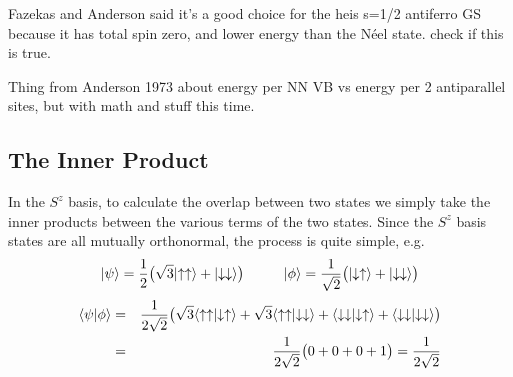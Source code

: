 



{\color{red} Fazekas and Anderson said it's a good choice for the heis s=1/2 antiferro GS
because it has total spin zero, and lower energy than the N\'eel state.  check if this is true.}

{\color{red} Thing from Anderson 1973 about energy per NN VB vs energy per 2 antiparallel sites,
but with math and stuff this time.}

\subsection{The Inner Product}

In the $S^z$ basis, to calculate the overlap between two states we simply take the inner products 
between the various terms of the two states.  
Since the $S^z$ basis states are all mutually orthonormal, the process is quite simple, e.g.
\begin{equation*}
\lvert {\psi} \rangle = \frac{1}{2}\big(\sqrt{3}\lvert {\uparrow\uparrow} \rangle + \lvert {\downarrow\downarrow} \rangle\big) \hspace{1cm}
\lvert {\phi} \rangle = \frac{1}{\sqrt{2}} \big(\lvert {\downarrow\uparrow} \rangle + \lvert {\downarrow\downarrow} \rangle\big) \nonumber
\end{equation*}
\begin{eqnarray}
\langle{\psi}\vert{\phi}\rangle&=& \frac{1}{2\sqrt{2}}\big(
		\sqrt{3}\langle{\uparrow\uparrow}\vert{\downarrow\uparrow}\rangle + \sqrt{3}\langle{\uparrow\uparrow}\vert{\downarrow\downarrow}\rangle +
		\langle{\downarrow\downarrow}\vert{\downarrow\uparrow}\rangle + \langle{\downarrow\downarrow}\vert{\downarrow\downarrow}\rangle
		\big) \nonumber \\
		&=& \frac{1}{2\sqrt{2}}\big(
		0 + 0 +
		0 +1
		\big)
		= \frac{1}{2\sqrt{2}}
\end{eqnarray}

